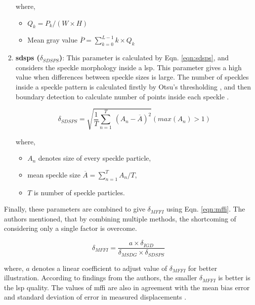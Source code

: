 \begin{enumerate}
                \noindent where,
                \begin{itemize}
                    \item \(Q_k = P_{k}/(W \times H)\)
                    \item Mean gray value \(\overline{P} = \sum_{k=0}^{L-1} k \times Q_k\)
                \end{itemize}   

            
            \item \textbf{\gls{sdsps} ($\delta_{SDSPS}$)}: This parameter is calculated by Eqn. \ref{eqn:sdsps}, and considers the speckle morphology inside a \gls{lsp}. This parameter gives a high value when differences between speckle sizes is large. The number of speckles inside a speckle pattern is calculated firstly by Otsu's thresholding \cite{otsu}, and then boundary detection to calculate number of points inside each speckle \cite{song}.  

            \begin{equation}
                \delta_{SDSPS} = \sqrt{\frac{1}{T} \displaystyle \sum_{n=1}^{T} \  (A_n - \overline{A})^2} (max(A_n) > 1)
                \label{eqn:sdsps}
            \end{equation}

            where,
            \begin{itemize}
                \item $A_n$ denotes size of every speckle particle,
                \item mean speckle size \(\overline{A} = \sum_{n=1}^{T} A_n / T\),
                \item $T$ is number of speckle particles.
            \end{itemize} 
        \end{enumerate}

        \noindent Finally, these parameters are combined to give $\delta_{MFFI}$ using Eqn. \ref{eqn:mffi}. The authors mentioned, that by combining multiple methods, the shortcoming of considering only a single factor is overcome.

        \begin{equation}
            \delta_{MFFI} = \dfrac{a \times \delta_{IGD}}{\delta_{MSDG} \times \delta_{SDSPS}}
            \label{eqn:mffi}
        \end{equation}

        \vspace{3mm}
        \noindent where, $a$ denotes a linear coefficient to adjust value of $\delta_{MFFI}$ for better illustration. According to findings from the authors, the smaller $\delta_{MFFI}$ is better is the \gls{lsp} quality. The values of \gls{mffi} are also in agreement with the mean bias error and standard deviation of error in measured displacements \cite{song}.


